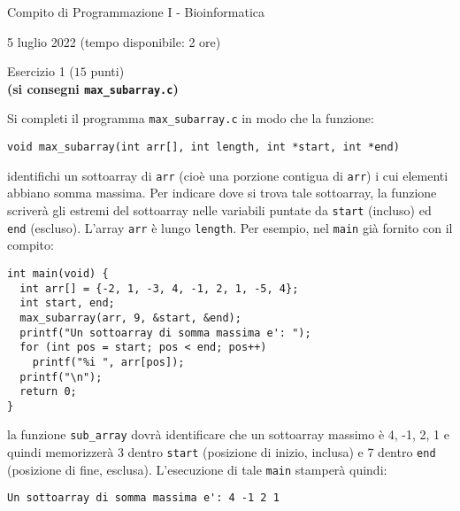\documentclass[12pt]{article}
\begin{document}
\begin{center}{\LARGE Compito di Programmazione I - Bioinformatica}\\
\begin{center}
  \large 5 luglio 2022 (tempo disponibile: 2 ore)
\end{center}
\end{center}

\vspace*{1ex}
\begin{center}{\Large Esercizio 1} ($15$ punti)\\
  \textbf{(si consegni \texttt{max\_subarray.c})}
\end{center}

Si completi il programma \texttt{max\_subarray.c} in modo che la funzione:

\begin{center}
  \begin{lstlisting}[language=myC]
    void max_subarray(int arr[], int length, int *start, int *end)
  \end{lstlisting}
\end{center}
%
identifichi un sottoarray di \texttt{arr} (cio\`e una porzione contigua di \texttt{arr})
i cui elementi abbiano somma massima. Per indicare dove si trova tale
sottoarray, la funzione scriver\`a gli estremi del sottoarray
nelle variabili puntate da \texttt{start} (incluso)
ed \texttt{end} (escluso). L'array \texttt{arr} \`e lungo \texttt{length}.
Per esempio, nel \texttt{main} gi\`a fornito con il compito:

\begin{center}
  \begin{lstlisting}[language=myC]
int main(void) {
  int arr[] = {-2, 1, -3, 4, -1, 2, 1, -5, 4};
  int start, end;
  max_subarray(arr, 9, &start, &end);
  printf("Un sottoarray di somma massima e': ");
  for (int pos = start; pos < end; pos++)
    printf("%i ", arr[pos]);
  printf("\n");
  return 0;
}
  \end{lstlisting}
\end{center}

\noindent
la funzione \texttt{sub\_array} dovr\`a identificare
che un sottoarray massimo \`e 4, -1, 2, 1 e quindi memorizzer\`a
3 dentro \texttt{start} (posizione di inizio, inclusa)
e 7 dentro \texttt{end} (posizione di fine, esclusa).
L'esecuzione di tale \texttt{main} stamper\`a quindi:

\begin{mdframed}[backgroundcolor=lightgrey] 
\begin{verbatim}
Un sottoarray di somma massima e': 4 -1 2 1
\end{verbatim}
\end{mdframed}
\end{document}
